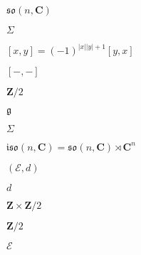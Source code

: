 \begin{preview}
\setcounter{equation}{0}%
\( \mathfrak{so}(n, \mathbf{C}) \)
\end{preview}

\begin{preview}
\setcounter{equation}{0}%
\( \Sigma \)
\end{preview}

\begin{preview}
\setcounter{equation}{0}%
\( [x,y] = (-1)^{|x||y| +1}[y,x] \)
\end{preview}

\begin{preview}
\setcounter{equation}{0}%
\( [-,-] \)
\end{preview}

\begin{preview}
\setcounter{equation}{0}%
\( \mathbf{Z}/2 \)
\end{preview}

\begin{preview}
\setcounter{equation}{0}%
\(  \mathfrak{g}  \)
\end{preview}

\begin{preview}
\setcounter{equation}{0}%
\( \Sigma \)
\end{preview}

\begin{preview}
\setcounter{equation}{0}%
\( \mathfrak{is o}(n , \mathbf{C})  = \mathfrak{so}(n, \mathbf{C}) \rtimes \mathbf{C}^n \)
\end{preview}

\begin{preview}
\setcounter{equation}{0}%
\( (\mathcal{E},d) \)
\end{preview}

\begin{preview}
\setcounter{equation}{0}%
\( d \)
\end{preview}

\begin{preview}
\setcounter{equation}{0}%
\( \mathbf{Z} \times \mathbf{Z}/2 \)
\end{preview}

\begin{preview}
\setcounter{equation}{0}%
\( \mathbf{Z}/2 \)
\end{preview}

\begin{preview}
\setcounter{equation}{0}%
\( \mathcal{E} \)
\end{preview}

